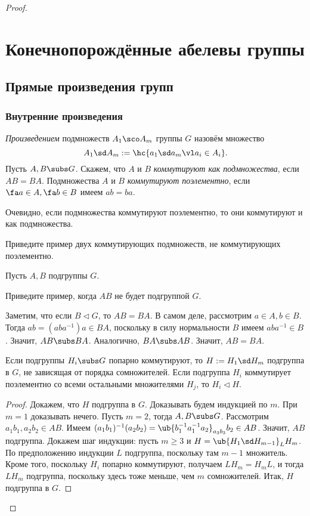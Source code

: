 \documentclass[a4paper]{article}
\begin{document}
\begin{proof}
\section{Конечнопорождённые абелевы группы}

\subsection{Прямые произведения групп}

\subsubsection{Внутренние произведения}

\begin{df}
\emph{Произведением} подмножеств $A_1\sco A_m$ группы $G$ назовём множество
$$A_1\sd A_m := \hc{a_1\sd a_m \vl a_i \in A_i}.$$
Пусть $A,B \subs G$. Скажем, что $A$ и $B$ \emph{коммутируют как подмножества}, если $AB=BA$.
Подмножества $A$ и $B$ \emph{коммутируют поэлементно},
если $\fa a \in A, \fa b \in B$ имеем $ab=ba$.
\end{df}

Очевидно, если подмножества коммутируют поэлементно, то они коммутируют и как подмножества.

\begin{problem}
Приведите пример двух коммутирующих подмножеств, не коммутирующих поэлементно.
\end{problem}

Пусть $A, B$ подгруппы $G$.

\begin{problem}
Приведите пример, когда $AB$ не будет подгруппой $G$.
\end{problem}

Заметим, что если $B \lhd G$, то $AB=BA$. В самом деле, рассмотрим  $a \in A, b \in B$. Тогда $ab=(aba^{-1})a
\in BA$, поскольку в силу нормальности $B$ имеем $aba^{-1} \in B$. Значит, $AB \subs BA$. Аналогично, $BA
\subs AB$. Значит, $AB=BA$.

\begin{theorem}
Если подгруппы $H_i \subs G$ попарно коммутируют, то $H:=H_1\sd H_m$ подгруппа в $G$, не зависящая от порядка
сомножителей. Если подгруппа $H_i$ коммутирует поэлементно со всеми остальными множителями $H_j$, то $H_i \lhd H$.
\end{theorem}
\begin{proof}
Докажем, что $H$ подгруппа в $G$. Доказывать будем индукцией по $m$.  При $m=1$ доказывать нечего. Пусть
$m=2$, тогда $A, B \subs G$. Рассмотрим $a_1b_1, a_2b_2 \in AB$. Имеем
$(a_1b_1)^{-1}(a_2b_2)=\ub{b_1^{-1}a_1^{-1}a_2}_{a_3b_3}b_2 \in AB$. Значит, $AB$ подгруппа. Докажем шаг
индукции: пусть $m \ge 3$ и $H=\ub{H_1\sd H_{m-1}}_L H_m$. По предположению индукции $L$ подгруппа,
поскольку там $m-1$ множитель. Кроме того, поскольку $H_i$ попарно коммутируют, получаем $LH_m=H_mL$, и тогда
$LH_m$ подгруппа, поскольку здесь тоже меньше, чем $m$ сомножителей. Итак, $H$ подгруппа в $G$.


\end{proof}
\end{proof}
\end{document}
